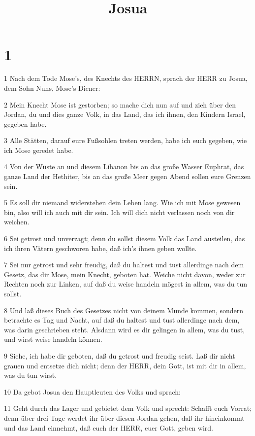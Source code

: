 

\title{Josua}


\chapter{1}

\par 1 Nach dem Tode Mose's, des Knechts des HERRN, sprach der HERR zu Josua, dem Sohn Nuns, Mose's Diener:
\par 2 Mein Knecht Mose ist gestorben; so mache dich nun auf und zieh über den Jordan, du und dies ganze Volk, in das Land, das ich ihnen, den Kindern Israel, gegeben habe.
\par 3 Alle Stätten, darauf eure Fußsohlen treten werden, habe ich euch gegeben, wie ich Mose geredet habe.
\par 4 Von der Wüste an und diesem Libanon bis an das große Wasser Euphrat, das ganze Land der Hethiter, bis an das große Meer gegen Abend sollen eure Grenzen sein.
\par 5 Es soll dir niemand widerstehen dein Leben lang. Wie ich mit Mose gewesen bin, also will ich auch mit dir sein. Ich will dich nicht verlassen noch von dir weichen.
\par 6 Sei getrost und unverzagt; denn du sollst diesem Volk das Land austeilen, das ich ihren Vätern geschworen habe, daß ich's ihnen geben wollte.
\par 7 Sei nur getrost und sehr freudig, daß du haltest und tust allerdinge nach dem Gesetz, das dir Mose, mein Knecht, geboten hat. Weiche nicht davon, weder zur Rechten noch zur Linken, auf daß du weise handeln mögest in allem, was du tun sollst.
\par 8 Und laß dieses Buch des Gesetzes nicht von deinem Munde kommen, sondern betrachte es Tag und Nacht, auf daß du haltest und tust allerdinge nach dem, was darin geschrieben steht. Alsdann wird es dir gelingen in allem, was du tust, und wirst weise handeln können.
\par 9 Siehe, ich habe dir geboten, daß du getrost und freudig seist. Laß dir nicht grauen und entsetze dich nicht; denn der HERR, dein Gott, ist mit dir in allem, was du tun wirst.
\par 10 Da gebot Josua den Hauptleuten des Volks und sprach:
\par 11 Geht durch das Lager und gebietet dem Volk und sprecht: Schafft euch Vorrat; denn über drei Tage werdet ihr über diesen Jordan gehen, daß ihr hineinkommt und das Land einnehmt, daß euch der HERR, euer Gott, geben wird.
